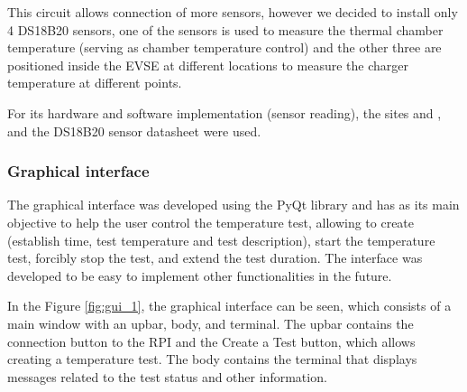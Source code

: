 This circuit allows connection of more sensors, however we decided to install only 4 DS18B20 sensors, one of the sensors is used to measure the thermal chamber temperature (serving as chamber temperature control) and the other three are positioned inside the EVSE at different locations to measure the charger temperature at different points.

For its hardware and software implementation (sensor reading), the sites \cite{Brian_Mark_Benoit_Santos_Alessandro_2023} and \cite{Campbell_2025}, and the DS18B20 sensor datasheet \cite{ds_datasheet} were used.

\subsubsection{Graphical interface}

The graphical interface was developed using the PyQt library and has as its main objective to help the user control the temperature test, allowing to create (establish time, test temperature and test description), start the temperature test, forcibly stop the test, and extend the test duration. The interface was developed to be easy to implement other functionalities in the future.

In the Figure \ref{fig:gui_1}, the graphical interface can be seen, which consists of a main window with an upbar, body, and terminal. The upbar contains the connection button to the RPI and the Create a Test button, which allows creating a temperature test. The body contains the terminal that displays messages related to the test status and other information.

